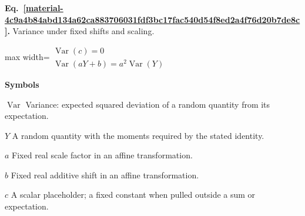 \documentclass[11pt,a4paper]{article}
\begin{document}
\par\medskip
\begin{samepage}
\label{material-4c9a4b84abd134a62ca883706031fdf3bc17fac540d54f8ed2a4f76d20b7de8c}
\noindent\textbf{Eq.~\ref*{material-4c9a4b84abd134a62ca883706031fdf3bc17fac540d54f8ed2a4f76d20b7de8c}.} Variance under fixed shifts and scaling.\par\nopagebreak
\begin{center}\begin{adjustbox}{max width=\linewidth}$\displaystyle \begin{gathered}\operatorname{Var}(c)=0\\\operatorname{Var}(aY+b)=a^2\operatorname{Var}(Y)\end{gathered}$\end{adjustbox}\end{center}

\par\noindent\textbf{Symbols}

\par\noindent\textbf{\(\operatorname{Var}\)} Variance: expected squared deviation of a random quantity from its expectation.

\par\noindent\textbf{\(Y\)} A random quantity with the moments required by the stated identity.

\par\noindent\textbf{\(a\)} Fixed real scale factor in an affine transformation.

\par\noindent\textbf{\(b\)} Fixed real additive shift in an affine transformation.

\par\noindent\textbf{\(c\)} A scalar placeholder; a fixed constant when pulled outside a sum or expectation.

\end{samepage}
\medskip
\end{document}
